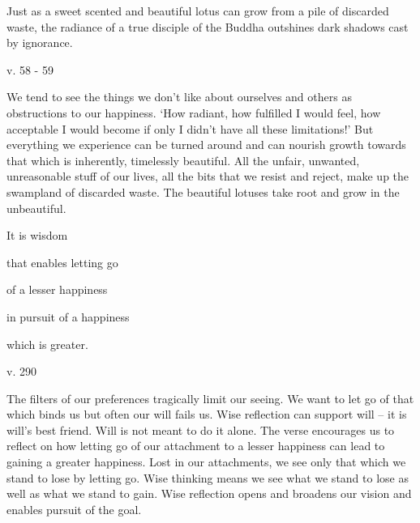 \documentclass[a4paper,portrait,12pt]{article}
\begin{document}
Just as a sweet scented and beautiful lotus
can grow from a pile of discarded waste,
the radiance of a true disciple of the Buddha
outshines dark shadows cast by ignorance.





v.  58 - 59





We tend to see the things we don't like about ourselves and others as obstructions to our happiness. `How radiant, how fulfilled I would feel, how acceptable I would become if only I didn't have all these limitations!' But everything we experience can be turned around and can nourish growth towards that which is inherently, timelessly beautiful. All the unfair, unwanted, unreasonable stuff of our lives, all the bits that we resist and reject, make up the swampland of discarded waste. The beautiful lotuses take root and grow in the unbeautiful. 














It is wisdom


that enables letting go


of a lesser happiness


in pursuit of a happiness


which is greater.





v. 290





The filters of our preferences tragically limit our seeing. We want to let go of that which binds us but often our will fails us. Wise reflection can support will -- it is will's best friend. Will is not meant to do it alone. The verse encourages us to reflect on how letting go of our attachment to a lesser happiness can lead to gaining a greater happiness. Lost in our attachments, we see only that which we stand to lose by letting go. Wise thinking means we see what we stand to lose as well as what we stand to gain. Wise reflection opens and broadens our vision and enables pursuit of the goal.
\end{document}
